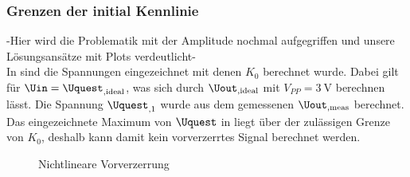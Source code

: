 \documentclass[../Report.tex]{subfiles}
\begin{document}
\subsubsection*{Grenzen der initial Kennlinie}
\label{subsubsec:opt.adjusta.problem}
-Hier wird die Problematik mit der Amplitude nochmal aufgegriffen und unsere Lösungsansätze mit Plots verdeutlicht-\\
In  sind die Spannungen eingezeichnet mit denen $K_0$ berechnet wurde. Dabei gilt für $\Uin = \Uquest_{,\mathrm{ideal}}$, was sich durch $\Uout_{,\mathrm{ideal}}$ mit $V_{PP} = \SI{3}{\V}$ berechnen lässt. Die Spannung $\Uquest_{,1}$ wurde aus dem gemessenen $\Uout_{,\mathrm{meas}}$ berechnet.\\
Das eingezeichnete Maximum von $\Uquest$ in  liegt über der zulässigen Grenze von $K_0$, deshalb kann damit kein vorverzerrtes Signal berechnet werden.

\begin{figure}[H]
\begin{subfigure}{0.5 \textwidth}
	\setlength\figureheight{8cm}
	\setlength\figurewidth{8cm}
		
	\label{fig:K0}
\end{subfigure}
\begin{subfigure}{0.5 \textwidth}
	\setlength\figureheight{8cm}
	\setlength\figurewidth{8cm}
    
	\label{fig:UinUquest}
\end{subfigure}
\caption{Nichtlineare Vorverzerrung}
\label{fig:Amplitudenproblem}
\end{figure}
\end{document}
